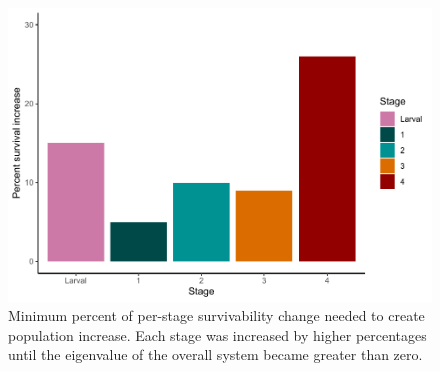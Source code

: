 \documentclass[
]{article}
\begin{document}
\begin{table}
\centering
\caption{\label{tab:lifetable}Stable stage distribution and reproductive value of each stage of this blue octopus population matrix given in Figure \ref{WriteMtxRounded}. The survivability (i.e.~the proportion of individuals who survive from stage i to stage i+1) in each stage includes death rate from fishing. Stages 1-4 survivability were calculated by summing up the proportion of individuals surviving and staying within a stage every month (\(P_i\)) and the proportion of individuals surviving and growing every month (\(G_i\)). Larval survivability of 0.0001328 was calculated by dividing our estimated number of larvae surviving back to stage 1 (\(F_4\)) by the average estimated reproductive output of \emph{O. cyanea}. \label{lifetable}}
\centering
{}
\end{table}



\begin{figure}
\centering
\includegraphics{Wulfing_OCyaneaSubmission_files/figure-latex/stages-1.pdf}
\caption{\label{fig:stages}Minimum percent of per-stage survivability change needed to create population increase. Each stage was increased by higher percentages until the eigenvalue of the overall system became greater than zero. \label{stages}}
\end{figure}
\end{document}
